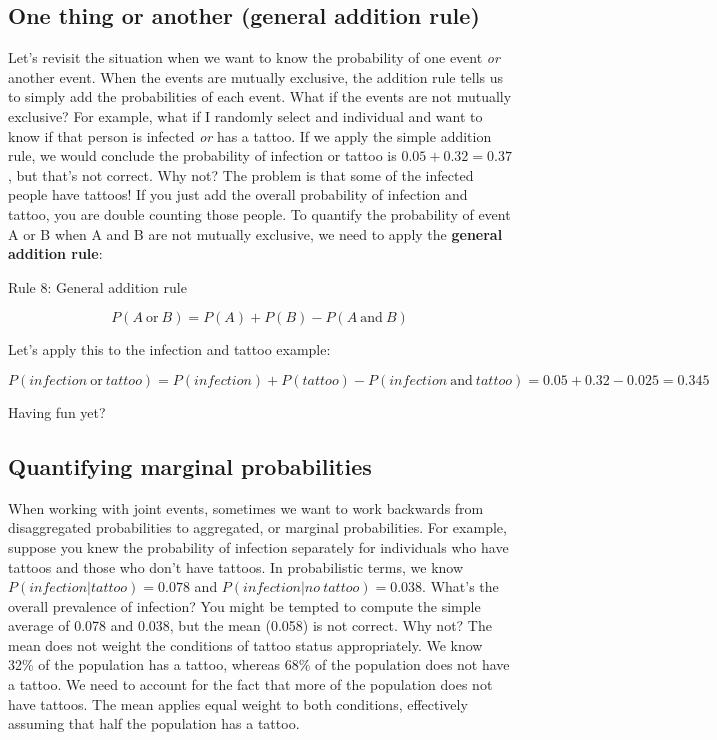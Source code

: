 \documentclass[
]{book}
\begin{document}
\subsection{One thing or another (general addition rule)}\label{one-thing-or-another-general-addition-rule}

Let's revisit the situation when we want to know the probability of one event \emph{or} another event. When the events are mutually exclusive, the addition rule tells us to simply add the probabilities of each event. What if the events are not mutually exclusive? For example, what if I randomly select and individual and want to know if that person is infected \emph{or} has a tattoo. If we apply the simple addition rule, we would conclude the probability of infection or tattoo is \(0.05 + 0.32 = 0.37\), but that's not correct. Why not? The problem is that some of the infected people have tattoos! If you just add the overall probability of infection and tattoo, you are double counting those people. To quantify the probability of event A or B when A and B are not mutually exclusive, we need to apply the \textbf{general addition rule}:

Rule 8: General addition rule

\[
P(A\ \text{or}\ B) = P(A) + P(B) - P(A\ \text{and}\ B)
\]

Let's apply this to the infection and tattoo example:

\[
P(infection\ \text{or}\ tattoo) = P(infection) + P(tattoo) - P(infection\ \text{and}\ tattoo)=0.05+0.32-0.025=0.345
\]

Having fun yet?

\subsection{Quantifying marginal probabilities}\label{quantifying-marginal-probabilities}

When working with joint events, sometimes we want to work backwards from disaggregated probabilities to aggregated, or marginal probabilities. For example, suppose you knew the probability of infection separately for individuals who have tattoos and those who don't have tattoos. In probabilistic terms, we know \(P(infection|tattoo) = 0.078\) and \(P(infection|no\ tattoo) = 0.038\). What's the overall prevalence of infection? You might be tempted to compute the simple average of 0.078 and 0.038, but the mean (0.058) is not correct. Why not? The mean does not weight the conditions of tattoo status appropriately. We know 32\% of the population has a tattoo, whereas 68\% of the population does not have a tattoo. We need to account for the fact that more of the population does not have tattoos. The mean applies equal weight to both conditions, effectively assuming that half the population has a tattoo.
\end{document}
